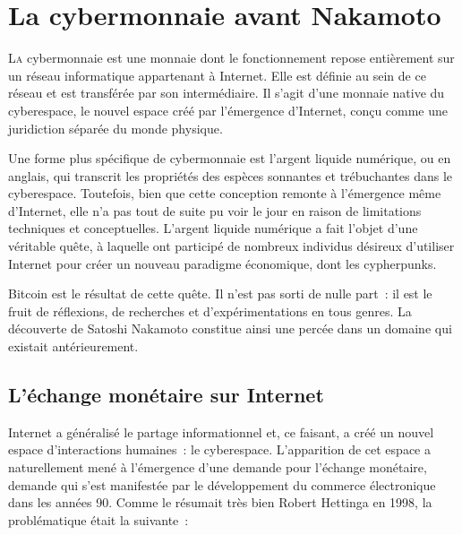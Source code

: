 
\chapter{La cybermonnaie avant Nakamoto}
\label{ch:cybermonnaie}
\label{enotezch:6}

\lettrine[]{L}a cybermonnaie est une monnaie dont le fonctionnement repose entièrement sur un réseau informatique appartenant à Internet. Elle est définie au sein de ce réseau et est transférée par son intermédiaire. Il s'agit d'une monnaie native du cyberespace, le nouvel espace créé par l'émergence d'Internet, conçu comme une juridiction séparée du monde physique.

Une forme plus spécifique de cybermonnaie est l'argent liquide numérique, ou  en anglais, qui transcrit les propriétés des espèces sonnantes et trébuchantes dans le cyberespace. Toutefois, bien que cette conception remonte à l'émergence même d'Internet, elle n'a pas tout de suite pu voir le jour en raison de limitations techniques et conceptuelles. L'argent liquide numérique a fait l'objet d'une véritable quête, à laquelle ont participé de nombreux individus désireux d'utiliser Internet pour créer un nouveau paradigme économique, dont les cypherpunks.

Bitcoin est le résultat de cette quête. Il n'est pas sorti de nulle part~: il est le fruit de réflexions, de recherches et d'expérimentations en tous genres. La découverte de Satoshi Nakamoto constitue ainsi une percée dans un domaine qui existait antérieurement.

\section*{L'échange monétaire sur Internet}

Internet a généralisé le partage informationnel et, ce faisant, a créé un nouvel espace d'interactions humaines~: le cyberespace. L'apparition de cet espace a naturellement mené à l'émergence d'une demande pour l'échange monétaire, demande qui s'est manifestée par le développement du commerce électronique dans les années 90. Comme le résumait très bien Robert Hettinga en 1998, la problématique était la suivante~:

